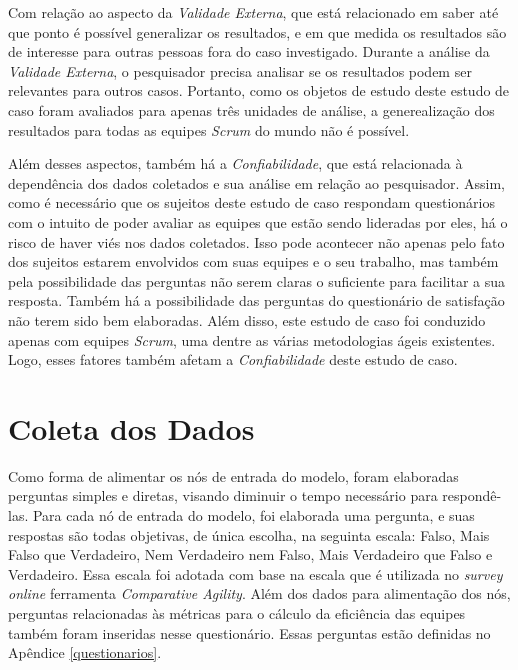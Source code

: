Com relação ao aspecto da \textit{Validade Externa}, que está relacionado em saber até que ponto é possível generalizar os resultados, e em que medida os resultados são de interesse para outras pessoas fora do caso investigado. Durante a análise da \textit{Validade Externa}, o pesquisador precisa analisar se os resultados podem ser relevantes para outros casos. Portanto, como os objetos de estudo deste estudo de caso foram avaliados para apenas três unidades de análise, a generealização dos resultados para todas as equipes \textit{Scrum} do mundo não é possível.

Além desses aspectos, também há a \textit{Confiabilidade}, que está relacionada à dependência dos dados coletados e sua análise em relação ao pesquisador. Assim, como é necessário que os sujeitos deste estudo de caso respondam questionários com o intuito de poder avaliar as equipes que estão sendo lideradas por eles, há o risco de haver viés nos dados coletados. Isso pode acontecer não apenas pelo fato dos sujeitos estarem envolvidos com suas equipes e o seu trabalho, mas também pela possibilidade das perguntas não serem claras o suficiente para facilitar a sua resposta. Também há a possibilidade das perguntas do questionário de satisfação não terem sido bem elaboradas. Além disso, este estudo de caso foi conduzido apenas com equipes \textit{Scrum}, uma dentre as várias metodologias ágeis existentes. Logo, esses fatores também afetam a \textit{Confiabilidade} deste estudo de caso.

\section{Coleta dos Dados}
\label{estudodecaso:coleta}

Como forma de alimentar os nós de entrada do modelo, foram elaboradas perguntas simples e diretas, visando diminuir o tempo necessário para respondê-las. Para cada nó de entrada do modelo, foi elaborada uma pergunta, e suas respostas são todas objetivas, de única escolha, na seguinta escala: Falso, Mais Falso que Verdadeiro, Nem Verdadeiro nem Falso, Mais Verdadeiro que Falso e Verdadeiro. Essa escala foi adotada com base na escala que é utilizada no \textit{survey online} ferramenta \textit{Comparative Agility}. Além dos dados para alimentação dos nós, perguntas relacionadas às métricas para o cálculo da eficiência das equipes também foram inseridas nesse questionário. Essas perguntas estão definidas no Apêndice \ref{questionarios}.

